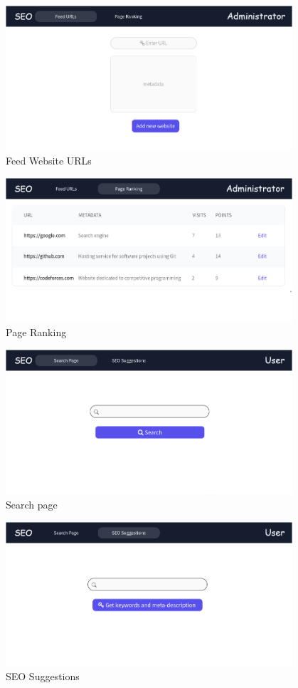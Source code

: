 \documentclass{scrartcl}
\begin{document}
\begin{figure}[H]
  \centering
  \includegraphics[width=0.95\textwidth]{feed-urls.png}
  \caption{Feed Website URLs}
\end{figure}

\begin{figure}[H]
  \centering
  \includegraphics[width=0.95\textwidth]{page-ranking.png}
  \caption{Page Ranking}
\end{figure}

\begin{figure}[H]
  \centering
  \includegraphics[width=0.95\textwidth]{search-page.png}
  \caption{Search page}
\end{figure}

\begin{figure}[H]
  \centering
  \includegraphics[width=0.95\textwidth]{seo-suggestions.png}
  \caption{SEO Suggestions}
\end{figure}
\end{document}
